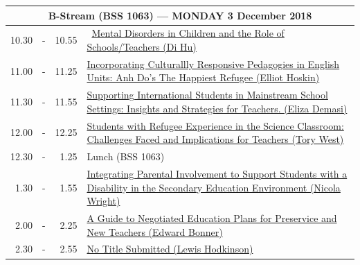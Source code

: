 \documentclass[twoside,12pt,a4paper,notitlepage]{memoir}
\begin{document}
\begin{center}
\begin{tabular}{rcr|p{10.8cm}}
\multicolumn{4}{c}{{\large B-Stream (BSS 1063) --- MONDAY 3 December 2018}} \\ \hline
 10.30 & - & 10.55 & 
\ \hyperref[aut:hu]{Mental Disorders in Children and the Role of Schools/Teachers (Di Hu)} \\ \hline
11.00 & - & 11.25 &
 \hyperref[aut:hoskin]{Incorporating Culturallly Responsive Pedagogies in English Units: Anh Do's The Happiest Refugee (Elliot Hoskin)} \\ \hline
11.30 & - & 11.55 &
 \hyperref[aut:demasi]{Supporting International Students in Mainstream School Settings: Insights and Strategies for Teachers. (Eliza Demasi)} \\ \hline
12.00 & - & 12.25 &
 \hyperref[aut:west]{Students with Refugee Experience in the Science Classroom: Challenges Faced and Implications for Teachers (Tory West)} \\ \hline
12.30 & - & 1.25 & Lunch (BSS 1063) \\ \hline
1.30 & - & 1.55 &
 \hyperref[aut:wright]{Integrating Parental Involvement to Support Students with a Disability in the Secondary Education Environment (Nicola Wright)} \\ \hline
2.00 & - & 2.25 &
 \hyperref[aut:bonner]{A Guide to Negotiated Education Plans for Preservice and New Teachers (Edward Bonner)} \\ \hline
2.30 & - & 2.55 &
 \hyperref[aut:hodkinson]{No Title Submitted (Lewis Hodkinson)} \\ \hline
\end{tabular}
\end{center}
\end{document}
